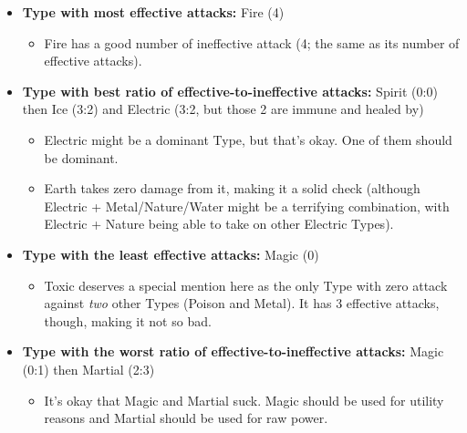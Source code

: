 \begin{itemize}
	\item{\textbf{Type with most effective attacks:} Fire (4)
		\begin{itemize}
			\item{Fire has a good number of ineffective attack (4; the same as its number of effective attacks).}
		\end{itemize}
	}
	\item{\textbf{Type with best ratio of effective-to-ineffective attacks:} Spirit (0:0) then Ice (3:2) and Electric (3:2, but those 2 are immune and healed by)
		\begin{itemize}
			\item{Electric might be a dominant Type, but that's okay. One of them should be dominant.}
			\item{Earth takes zero damage from it, making it a solid check (although Electric + Metal/Nature/Water might be a terrifying combination, with Electric + Nature being able to take on other Electric Types).}
		\end{itemize}
	}
	\item{\textbf{Type with the least effective attacks:} Magic (0)
		\begin{itemize}
			\item{Toxic deserves a special mention here as the only Type with zero attack against \textit{two} other Types (Poison and Metal). It has 3 effective attacks, though, making it not so bad.}
		\end{itemize}
	}
	\item{\textbf{Type with the worst ratio of effective-to-ineffective attacks:} Magic (0:1) then Martial (2:3)
		\begin{itemize}
			\item{It's okay that Magic and Martial suck. Magic should be used for utility reasons and Martial should be used for raw power.}
		\end{itemize}
	}
\end{itemize}

